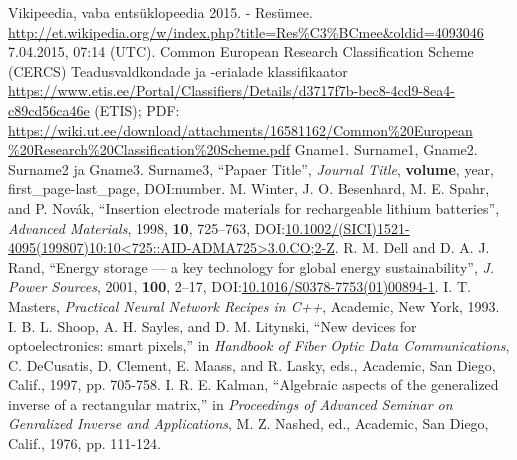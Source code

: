 \documentclass[12pt]{report}
\begin{document}
\begin{thebibliography}{99}
 Vikipeedia, vaba ents\"uklopeedia 2015. - Res\"umee.\\ \href{http://et.wikipedia.org/w/index.php?title=Res\%C3\%BCmee\&oldid=4093046}{http://et.wikipedia.org/w/index.php?title=Res\%C3\%BCmee\&oldid=4093046} 7.04.2015, 07:14 (UTC).
 Common European Research Classification Scheme (CERCS) Teadusvaldkondade ja -erialade klassifikaator \href{https://www.etis.ee/Portal/Classifiers/Details/d3717f7b-bec8-4cd9-8ea4-c89cd56ca46e}{https://www.etis.ee/Portal/Classifiers/Details/d3717f7b-bec8-4cd9-8ea4-c89cd56ca46e} (ETIS); PDF: \href{https://wiki.ut.ee/download/attachments/16581162/Common\%20European\%20Research\%20Classification\%20Scheme.pdf}{https://wiki.ut.ee/download/attachments/16581162/Common\%20European\\
\%20Research\%20Classification\%20Scheme.pdf}
Gname1. Surname1, Gname2. Surname2 ja Gname3. Surname3, ``Papaer Title'', \textit{Journal Title}, \textbf{volume}, year, first\_page-last\_page, DOI:number.
M. Winter, J. O. Besenhard, M. E. Spahr, and P. Nov\'ak,
``Insertion electrode materials for rechargeable lithium batteries'',
\textit{Advanced Materials}, 1998, \textbf{10}, 725--763, DOI:\href{http://dx.doi.org/10.1002/(SICI)1521-4095(199807)10:10<725::AID-ADMA725>3.0.CO;2-Z}{10.1002/(SICI)1521-4095(199807)10:10<725::AID-ADMA725>3.0.CO;2-Z}.
R. M. Dell and D. A. J. Rand,
``Energy storage --- a key technology for global energy sustainability'',
\textit{J. Power Sources}, 2001, \textbf{100}, 2--17, DOI:\href{http://dx.doi.org/10.1016/S0378-7753(01)00894-1}{10.1016/S0378-7753(01)00894-1}.
I. T. Masters, \textit{Practical Neural Network Recipes in C++}, Academic, New York, 1993.
I. B. L. Shoop, A. H. Sayles, and D. M. Litynski, ``New devices for optoelectronics: smart pixels,'' in \textit{Handbook of Fiber Optic Data Communications}, C. DeCusatis, D. Clement, E. Maass, and R. Lasky, eds., Academic, San Diego, Calif., 1997, pp. 705-758.
I. R. E. Kalman, ``Algebraic aspects of the generalized inverse of a rectangular matrix,'' in \textit{Proceedings of Advanced Seminar on Genralized Inverse and Applications}, M. Z. Nashed, ed., Academic, San Diego, Calif., 1976, pp. 111-124.

\end{thebibliography}
\end{document}

